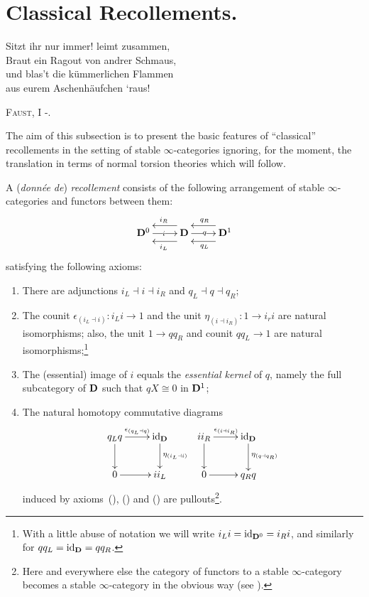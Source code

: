 \section{Classical Recollements.}\label{classical}
\setlength{\epigraphwidth}{.5\textwidth}
\epigraph{
	Sitzt ihr nur immer! leimt zusammen,\\
	Braut ein Ragout von andrer Schmaus,\\
	und blas't die k\"ummerlichen Flammen\\ 
	aus eurem Aschenh\"aufchen `raus!}{\textsc{Faust}, I -.}
\setlength{\epigraphwidth}{\DefaultEpigraphWidth}
The aim of this subsection is to present the basic features of ``classical'' recollements in the setting of stable $\infty$\hyp{}categories ignoring, for the moment, the translation in terms of normal torsion theories which will follow.
\begin{definition}\label{def:recol}
A (\emph{donnée de}) \emph{recollement} consists of the following arrangement of stable $\infty$\hyp{}categories and functors between them:
\[\label{rec}
\xymatrix{
  \D^0	& \D	& \D^1
  \ar|i "1,1";"1,2" 
  \ar@<8pt>^{i_L} "1,2";"1,1" 
  \ar@<-8pt>_{i_R} "1,2";"1,1" 
  \ar|q "1,2";"1,3" 
  \ar@<8pt>^{q_L} "1,3";"1,2" 
  \ar@<-8pt>_{q_R} "1,3";"1,2" 
}
\]
satisfying the following axioms:
\begin{enumerate}
\item There are adjunctions $i_L\dashv i\dashv i_R$ and $q_L\dashv q\dashv q_R$;
\item The counit $\epsilon_{(i_L\dashv i)} \colon i_L i \to 1$ and the unit $\eta_{(i\dashv i_R)}\colon 1\to i_r i$ are natural isomorphisms; also, the unit $1\to qq_R$ and counit $qq_L \to 1$ are natural isomorphisms;\footnote{With a little abuse of notation we will write $i_L i = \text{id}_{\mathbf{D}^0} = i_R i$, and similarly for $qq_L = \text{id}_{\mathbf{D}} = qq_R$.}
\item The (essential) image of $i$ equals the \emph{essential kernel} of $q$, namely the full subcategory of $\mathbf{D}$ such that $qX\cong 0$ in $\mathbf{D}^1$;
\item 
The natural homotopy commutative diagrams 
\[
\xymatrix{
  q_L q & \id_\D  & ii_R  & \id_\D \\
  0 & ii_L  & 0 & q_R q
  \ar "1,1";"1,2" ^{\epsilon_{(q_L\dashv q)}}
  \ar "1,1";"2,1" 
  \ar "1,2";"2,2" ^{\eta_{(i_L\dashv i)}}
  \ar "1,3";"1,4" ^{\epsilon_{(i\dashv i_R)}}
  \ar "1,3";"2,3" 
  \ar "1,4";"2,4" ^{\eta_{(q\dashv q_R)}}
  \ar "2,1";"2,2" 
  \ar "2,3";"2,4" 
}
\]
induced by axioms~(), () and ()
are pullouts\footnote{Here and everywhere else the category of functors to a stable $\infty$\hyp{}category becomes a stable $\infty$\hyp{}category in the obvious way (see \cite[ \textbf{1.1.3.1}]{LurieHA}).}.
\end{enumerate}
\end{definition}
